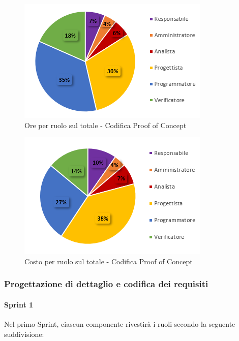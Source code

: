\begin{figure}[H]
  \centering
  \includegraphics[scale=1]{immagini/ore_ruolo_PoC.png}
  \caption{Ore per ruolo sul totale - Codifica Proof of Concept}
\end{figure}

\begin{figure}[H]
  \centering
  \includegraphics[scale=1]{immagini/costo_ruolo_PoC.png}
  \caption{Costo per ruolo sul totale - Codifica Proof of Concept}
\end{figure}


\subsubsection{Progettazione di dettaglio e codifica dei requisiti} \label{subsubsection:preventivo_progettazione_dettaglio}
\paragraph{Sprint 1} \label{paragraph:preventivo_sprint1}
Nel primo Sprint\glo{}, ciascun componente rivestirà i ruoli secondo la seguente suddivisione:

